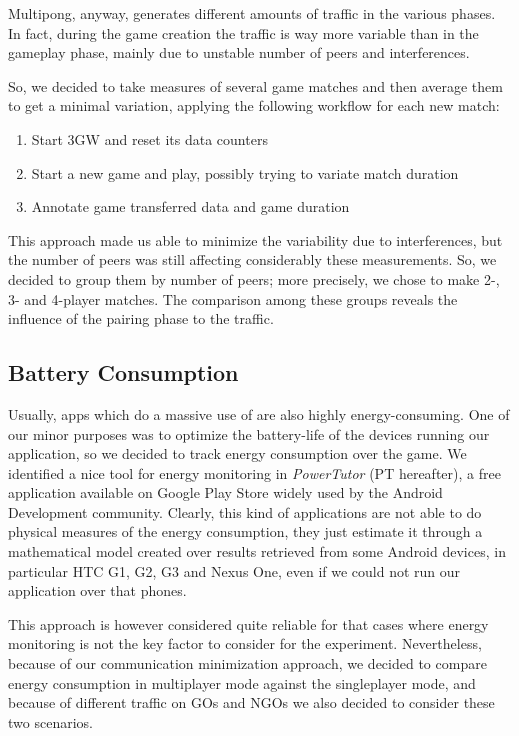 Multipong, anyway, generates different amounts of traffic in the various
phases. In fact, during the game creation the traffic is way more variable than
in the gameplay phase, mainly due to unstable number of peers and \wifi{}
interferences.

So, we decided to take measures of several game matches and then average them to get a minimal variation, applying the following workflow for each new match:

\begin{enumerate} %
  \item Start 3GW and reset its data counters
  \item Start a new game and play, possibly trying to variate match duration
  \item Annotate game transferred data and game duration
\end{enumerate}

This approach made us able to minimize the variability due to interferences, but the number of peers was still affecting considerably these measurements. So, we decided to group them by number of peers; more precisely, we chose to make 2-, 3- and 4-player matches. The comparison among these groups reveals the influence of the pairing phase to the traffic.

\subsection{Battery Consumption}

Usually, apps which do a massive use of \wifi{} are also highly energy-consuming. One of our minor purposes was to optimize the battery-life of the devices running our application, so we decided to track energy consumption over the game. We identified a nice tool for energy monitoring in \textit{PowerTutor} (PT hereafter), a free application available on Google Play Store widely used by the Android Development community. Clearly, this kind of applications are not able to do physical measures of the energy consumption, they just estimate it through a mathematical model created over results retrieved from some Android devices, in particular HTC G1, G2, G3 and Nexus One, even if we could not run our application over that phones. 

This approach is however considered quite reliable for that cases where energy monitoring is not the key factor to consider for the experiment. Nevertheless, because of our communication minimization approach, we decided to compare energy consumption in multiplayer mode against the singleplayer mode, and because of different traffic on GOs and NGOs we also decided to consider these two scenarios.
